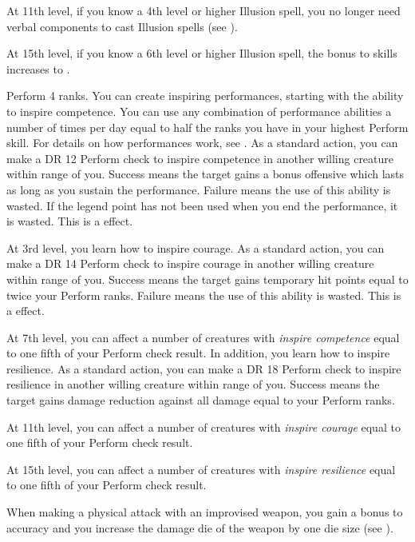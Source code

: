     At 11th level, if you know a 4th level or higher Illusion spell, you no longer need verbal components to cast Illusion spells (see ).

    At 15th level, if you know a 6th level or higher Illusion spell, the bonus to skills increases to .

    \featpre Perform 4 ranks.
    \featben You can create inspiring performances, starting with the ability to inspire competence.
    You can use any combination of performance abilities a number of times per day equal to half the ranks you have in your highest Perform skill.
    For details on how performances work, see .
    As a standard action, you can make a DR 12 Perform check to inspire competence in another willing creature within \rngmed range of you.
    Success means the target gains a bonus offensive  which lasts as long as you sustain the performance.
    Failure means the use of this ability is wasted.
    If the legend point has not been used when you end the performance, it is wasted.
    This is a  effect.

    At 3rd level, you learn how to inspire courage.
     As a standard action, you can make a DR 14 Perform check to inspire courage in another willing creature within \rngmed range of you.
    Success means the target gains temporary hit points equal to twice your Perform ranks.
    Failure means the use of this ability is wasted.
    This is a  effect.

    At 7th level, you can affect a number of creatures with \textit{inspire competence} equal to one fifth of your Perform check result.
    In addition, you learn how to inspire resilience.
     As a standard action, you can make a DR 18 Perform check to inspire resilience in another willing creature within \rngmed range of you.
    Success means the target gains damage reduction against all damage equal to your Perform ranks.

    At 11th level, you can affect a number of creatures with \textit{inspire courage} equal to one fifth of your Perform check result.

    At 15th level, you can affect a number of creatures with \textit{inspire resilience} equal to one fifth of your Perform check result.

    \featben When making a physical attack with an improvised weapon, you gain a  bonus to accuracy and you increase the damage die of the weapon by one die size (see ).

